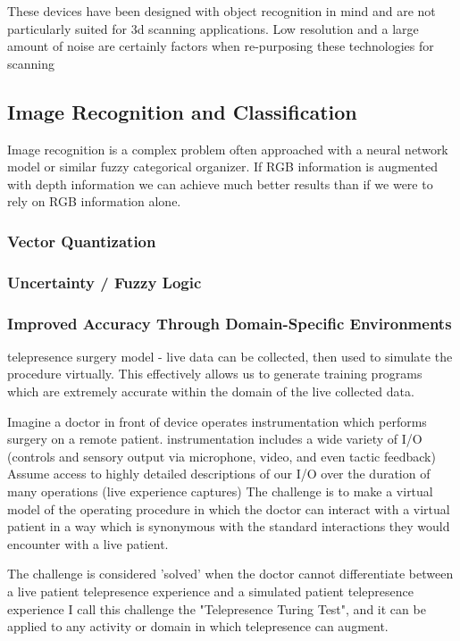 \documentclass[a4paper,12pt]{report}
\begin{document}
These devices have been designed with object recognition in mind and are not particularly suited for 3d scanning applications. Low resolution and a large amount of noise are certainly factors when re-purposing these technologies for scanning\cite{6296662} 
\subsection{Image Recognition and Classification}
Image recognition is a complex problem often approached with a neural network model or similar fuzzy categorical organizer. If RGB information is augmented with depth information we can achieve much better results than if we were to rely on RGB information alone.
\subsubsection{Vector Quantization}
\subsubsection{Uncertainty / Fuzzy Logic}
\subsubsection{Improved Accuracy Through Domain-Specific Environments}
telepresence surgery model - live data can be collected, then used to simulate the procedure virtually. 
This effectively allows us to generate training programs which are extremely accurate within the domain of the live collected data.

Imagine a doctor in front of device operates instrumentation which performs surgery on a remote patient.
instrumentation includes a wide variety of I/O (controls and sensory output via microphone, video, and even tactic feedback)
Assume access to highly detailed descriptions of our I/O over the duration of many operations (live experience captures)
The challenge is to make a virtual model of the operating procedure in which the doctor can interact with a virtual patient in a way which is synonymous with the standard interactions they would encounter with a live patient.

The challenge is considered 'solved' when the doctor cannot differentiate between a live patient telepresence experience and a simulated patient telepresence experience
I call this challenge the "Telepresence Turing Test", and it can be applied to any activity or domain in which telepresence can augment.
\end{document}
